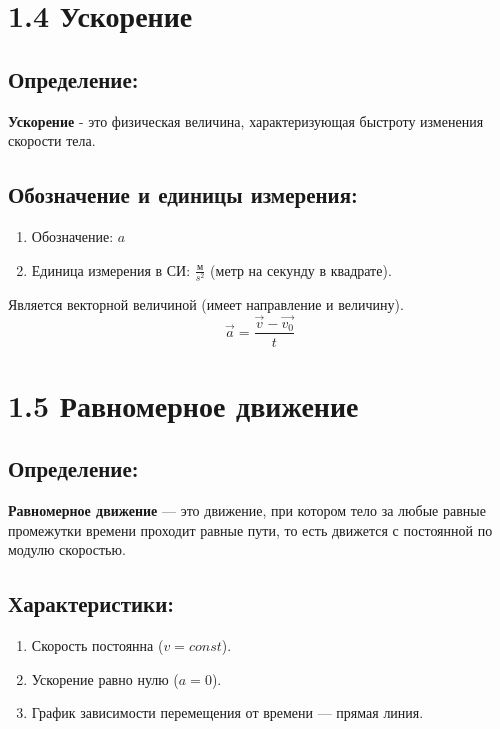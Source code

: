 \documentclass[a4paper,12pt]{article}
\begin{document}
\section*{1.4 Ускорение}

\vspace{-9pt}
\subsection*{Определение:}
\vspace{-3pt}
\textbf{Ускорение} - это физическая величина, характеризующая быстроту изменения скорости тела.
\vspace{-9pt}
\subsection*{Обозначение и единицы измерения:}
\vspace{-3pt}
\begin{enumerate} [itemsep=0pt, topsep=0pt, parsep=3pt]
  \item Обозначение: $a$
  \item Единица измерения в СИ: $\frac{м}{s^2}$ (метр на секунду в квадрате).
\end{enumerate}
Является векторной величиной (имеет направление и величину).
$$ \vec{a} = \frac{\vec{v} - \vec{v_0}}{t} $$


\newpage


\section*{1.5 Равномерное движение}

\vspace{-9pt}
\subsection*{Определение:}
\vspace{-3pt}
\textbf{Равномерное движение} — это движение, при котором тело за любые равные промежутки времени проходит равные пути, то есть движется с постоянной по модулю скоростью.
\vspace{-9pt}
\subsection*{Характеристики:}
\vspace{-3pt}
\begin{enumerate} [itemsep=0pt, topsep=0pt, parsep=3pt]
  \item Скорость постоянна ($v = const$).
  \item Ускорение равно нулю ($a = 0$).
  \item График зависимости перемещения от времени — прямая линия.
\end{enumerate}
\vspace{-9pt}
\end{document}
